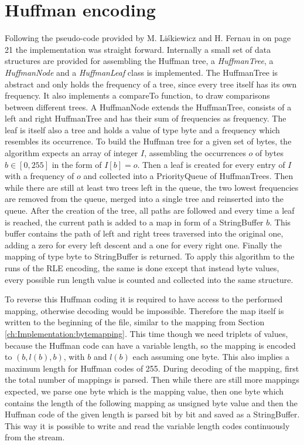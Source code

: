 \section{Huffman encoding}
\label{ch:Implementation:Huffman}
\par{
Following the pseudo-code provided by M. Liśkiewicz and H. Fernau in \cite{entropy-fernau} on page 21 the implementation was straight forward. Internally a small set of data structures are provided for assembling the Huffman tree, a \emph{HuffmanTree}, a \emph{HuffmanNode} and a \emph{HuffmanLeaf} class is implemented. The HuffmanTree is abstract and only holds the frequency of a tree, since every tree itself has its own frequency. It also implements a compareTo function, to draw comparisons between different trees. A HuffmanNode extends the HuffmanTree, consists of a left and right HuffmanTree and has their sum of frequencies as frequency. The leaf is itself also a tree and holds a value of type byte and a frequency which resembles its occurrence. To build the Huffman tree for a given set of bytes, the algorithm expects an array of integer $I$, assembling the occurrences $o$ of bytes $b \in [ 0,255 ]$ in the form of $I [ b ] = o$. Then a leaf is created for every entry of $I$ with a frequency of $o$ and collected into a PriorityQueue of HuffmanTrees. Then while there are still at least two trees left in the queue, the two lowest frequencies are removed from the queue, merged into a single tree and reinserted into the queue. After the creation of the tree, all paths are followed and every time a leaf is reached, the current path is added to a map in form of a StringBuffer $b$. This buffer contains the path of left and right trees traversed into the original one, adding a zero for every left descent and a one for every right one. Finally the mapping of type byte to StringBuffer is returned. To apply this algorithm to the runs of the RLE encoding, the same is done except that instead byte values, every possible run length value is counted and collected into the same structure.
}
\par{
To reverse this Huffman coding it is required to have access to the performed mapping, otherwise decoding would be impossible. Therefore the map itself is written to the beginning of the file, similar to the mapping from Section \ref{ch:Implementation:bytemapping}. This time though we need triplets of values, because the Huffman code can have a variable length, so the mapping is encoded to $(b,l(b),b)$, with $b$ and $l(b)$ each assuming one byte. This also implies a maximum length for Huffman codes of 255. During decoding of the mapping, first the total number of mappings is parsed. Then while there are still more mappings expected, we parse one byte which is the mapping value, then one byte which contains the length of the following mapping as unsigned byte value and then the Huffman code of the given length is parsed bit by bit and saved as a StringBuffer. This way it is possible to write and read the variable length codes continuously from the stream. 
}
